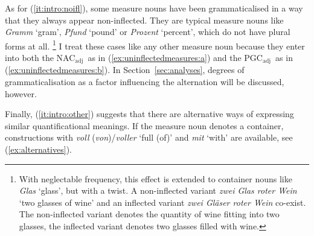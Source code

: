 \documentclass[USenglish]{article}
\newcommand{\Sub}[1]{\ensuremath{\mathrm{_{#1}}}}
\newcommand{\NACa}{NAC\Sub{adj}}
\newcommand{\PGCa}{PGC\Sub{adj}}
\begin{document}
As for (\ref{it:intro:noifl}), some measure nouns have been grammaticalised in a way that they always appear non-inflected.
They are typical measure nouns like \textit{Gramm} `gram', \textit{Pfund} `pound' or \textit{Prozent} `percent', which do not have plural forms at all.%
\footnote{With neglectable frequency, this effect is extended to container nouns like \textit{Glas} `glass', but with a twist.
A non-inflected variant \textit{zwei Glas roter Wein} `two glasses of wine' and an inflected variant \textit{zwei Gläser roter Wein} co-exist.
The non-inflected variant denotes the quantity of wine fitting into two glasses, the inflected variant denotes two glasses filled with wine.}
I treat these cases like any other measure noun because they enter into both the \NACa\ as in (\ref{ex:uninflectedmeasures:a}) and the \PGCa\ as in (\ref{ex:uninflectedmeasures:b}).
In Section~\ref{sec:analyses}, degrees of grammaticalisation as a factor influencing the alternation will be discussed, however. 

\begin{exe}
  \ex\label{ex:uninflectedmeasures}
  \begin{xlist}
  \end{xlist}
\end{exe}

Finally, (\ref{it:intro:other}) suggests that there are alternative ways of expressing similar quantificational meanings.
%
%
If the measure noun denotes a container, constructions with \textit{voll} (\textit{von})\slash\textit{voller} `full (of)' and \textit{mit} `with' are available, see (\ref{ex:alternatives}).
\end{document}

